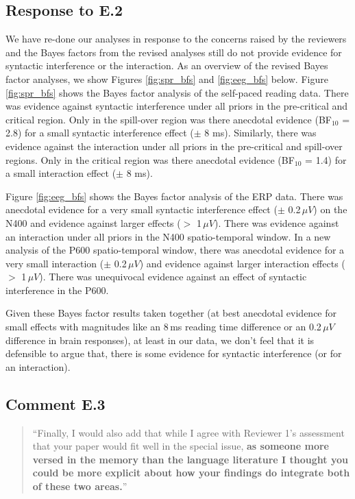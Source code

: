 \documentclass[12pt]{article}
\begin{document}
\subsection*{Response to E.2}
We have re-done our analyses in response to the concerns raised by the reviewers and the Bayes factors from the revised analyses still do not provide evidence for syntactic interference or the interaction. As an overview of the revised Bayes factor analyses, we show Figures \ref{fig:spr_bfs} and \ref{fig:eeg_bfs} below. Figure \ref{fig:spr_bfs} shows the Bayes factor analysis of the self-paced reading data. There was evidence against syntactic interference under all priors in the pre-critical and critical region. Only in the spill-over region was there anecdotal evidence (BF$_{10}$ = 2.8) for a small syntactic interference effect ($\pm$ 8 ms). Similarly, there was evidence against the interaction under all priors in the pre-critical and spill-over regions. Only in the critical region was there anecdotal evidence (BF$_{10}$ = 1.4) for a small interaction effect ($\pm$ 8 ms). 

\setcounter{figure}{4}

Figure \ref{fig:eeg_bfs} shows the Bayes factor analysis of the ERP data. There was anecdotal evidence for a very small syntactic interference effect ($\pm$ 0.2\,$\mu V$) on the N400 and evidence against larger effects ($>$ 1\,$\mu V$). There was evidence against an interaction under all priors in the N400 spatio-temporal window. In a new analysis of the P600 spatio-temporal window, there was anecdotal evidence for a very small interaction ($\pm$ 0.2\,$\mu V$) and evidence against larger interaction effects ($>$ 1\,$\mu V$). There was unequivocal evidence against an effect of syntactic interference in the P600.

Given these Bayes factor results taken together (at best anecdotal evidence for small effects with magnitudes like an 8\,ms reading time difference or an 0.2\,$\mu V$ difference in brain responses), at least in our data, we don't feel that it is defensible to argue that, there is some evidence for syntactic interference (or for an interaction). 

\setcounter{figure}{10}

\subsection*{Comment E.3}
\begin{quote}
``Finally, I would also add that while I agree with Reviewer 1's assessment that your paper would fit well in the special issue, \textbf{as someone more versed in the memory than the language literature I thought you could be more explicit about how your findings do integrate both of these two areas.}''
\end{quote}
\end{document}
